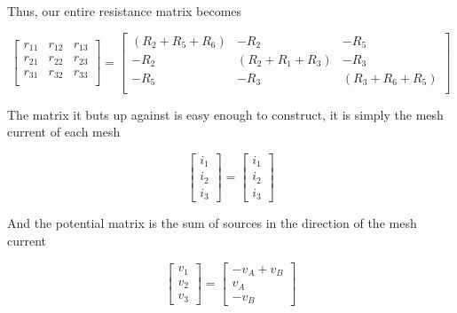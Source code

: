 \documentclass[11pt]{book}
\begin{document}
Thus, our entire resistance matrix becomes

\begin{equation}
	\begin{bmatrix}
		r_{11} & r_{12} & r_{13} \\
		r_{21} & r_{22} & r_{23} \\
		r_{31} & r_{32} & r_{33} \\
	\end{bmatrix}
	=
	\begin{bmatrix}
		(R_2 + R_5 + R_6) & -R_2 & -R_5 \\
		-R_2 & (R_2 + R_1 + R_3) & -R_3 \\
		-R_5 & -R_3 & (R_3 + R_6 + R_5) \\
	\end{bmatrix}
\end{equation}

The matrix it buts up against is easy enough to construct, it is simply the mesh current of each mesh

\begin{equation}
	\begin{bmatrix}
		i_1 \\ i_2 \\ i_3
	\end{bmatrix}
	=
	\begin{bmatrix}
		i_1 \\ i_2 \\ i_3
	\end{bmatrix}
\end{equation}
	
And the potential matrix is the sum of sources in the direction of the mesh current

\begin{equation}
		\begin{bmatrix}
		v_1 \\ v_2 \\ v_3
	\end{bmatrix}
	=
	\begin{bmatrix}
		-v_A + v_B \\ v_A \\ -v_B
	\end{bmatrix}
\end{equation}
\end{document}
